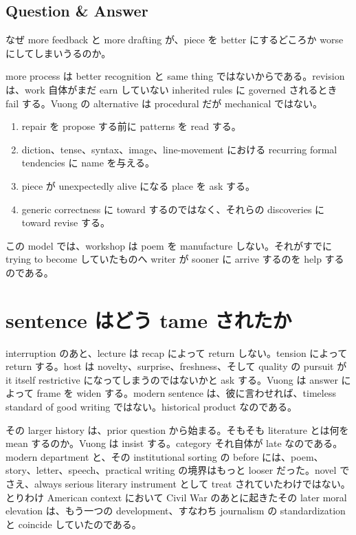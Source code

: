 \subsection{Question \& Answer}

なぜ more feedback と more drafting が、piece を better にするどころか worse にしてしまいうるのか。

more process は better recognition と same thing ではないからである。revision は、work 自体がまだ earn していない inherited rules に governed されるとき fail する。Vuong の alternative は procedural だが mechanical ではない。
\begin{enumerate}
\item repair を propose する前に patterns を read する。
\item diction、tense、syntax、image、line-movement における recurring formal tendencies に name を与える。
\item piece が unexpectedly alive になる place を ask する。
\item generic correctness に toward するのではなく、それらの discoveries に toward revise する。
\end{enumerate}
この model では、workshop は poem を manufacture しない。それがすでに trying to become していたものへ writer が sooner に arrive するのを help するのである。

\section{sentence はどう tame されたか}

interruption のあと、lecture は recap によって return しない。tension によって return する。host は novelty、surprise、freshness、そして quality の pursuit が it itself restrictive になってしまうのではないかと ask する。Vuong は answer によって frame を widen する。modern sentence は、彼に言わせれば、timeless standard of good writing ではない。historical product なのである。

その larger history は、prior question から始まる。そもそも literature とは何を mean するのか。Vuong は insist する。category それ自体が late なのである。modern department と、その institutional sorting の before には、poem、story、letter、speech、practical writing の境界はもっと looser だった。novel でさえ、always serious literary instrument として treat されていたわけではない。とりわけ American context において Civil War のあとに起きたその later moral elevation は、もう一つの development、すなわち journalism の standardization と coincide していたのである。

